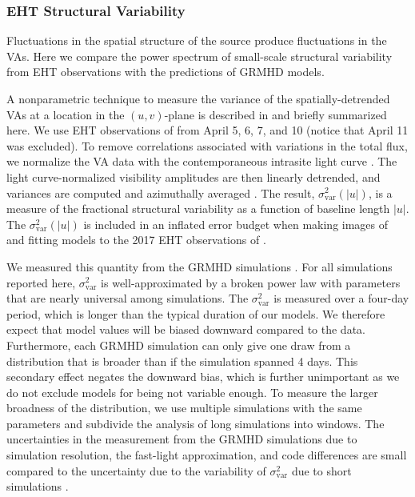 \subsubsection{EHT Structural Variability}

Fluctuations in the spatial structure of the source produce fluctuations in the VAs.
Here we compare  the power spectrum of small-scale structural variability from EHT observations with the predictions of GRMHD models.

A nonparametric technique to measure the variance of the spatially-detrended VAs at a location in the $(u,v)$-plane is described in \citet{NoiseModeling} and briefly summarized here.
We use EHT observations of \sgra from April 5, 6, 7, and 10 (notice that April 11 was excluded).
To remove correlations associated with variations in the total flux, we normalize the VA data with the contemporaneous intrasite light curve \citep{Georgiev_2022}.
The light curve-normalized visibility amplitudes are then linearly detrended, and variances are computed and azimuthally averaged \citep{NoiseModeling}.
The result, $\sigma_\text{var}^2 (|u|)$, is a measure of the fractional structural variability as a function of baseline length $|u|$.
The $\sigma_\text{var}^2 (|u|)$ is included in an inflated error budget when making images of and fitting models to the 2017 EHT observations of \sgra {}.

We measured this quantity from the GRMHD simulations \citep[see][for details]{Georgiev_2022}.
For all simulations reported here, $\sigma_\text{var}^2$ is well-approximated by a broken power law with parameters that are nearly universal among simulations.
The $\sigma_\text{var}^2$ is measured over a four-day period, which is longer than the typical duration of our models.
We therefore expect that model values will be biased downward compared to the data. Furthermore, each GRMHD simulation can only give one draw from a distribution that is broader than if the simulation spanned 4 days. This secondary effect negates the downward bias, which is further unimportant as we do not exclude models for being not variable enough. To measure the larger broadness of the distribution, we use multiple simulations with the same parameters and subdivide the analysis of long simulations into windows.
The uncertainties in the measurement from the GRMHD simulations due to simulation resolution, the fast-light approximation, and code differences are small compared to the uncertainty due to the variability of $\sigma_\text{var}^2$ due to short simulations \citep{Georgiev_2022}.

